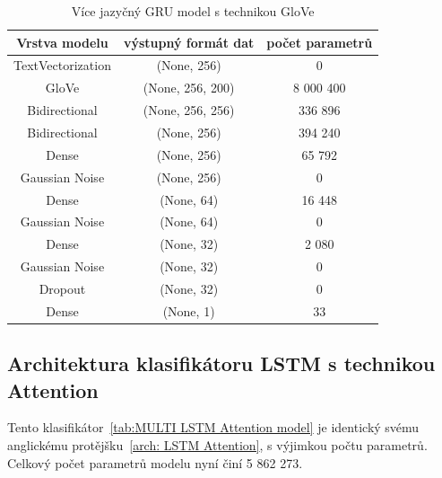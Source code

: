\begin{table}[H]
	\centering
	\caption{Více jazyčný GRU model s technikou GloVe}\label{tab:MULTI GRU GloVe model}
	\begin{tabular}{ c c c }
			\toprule
			Vrstva modelu & výstupný formát dat & počet parametrů\\
			\midrule
            TextVectorization & (None, 256) & 0\\         
            GloVe & (None, 256, 200) & 8 000 400\\   
            Bidirectional & (None, 256, 256) & 336 896\\    
            Bidirectional & (None, 256) & 394 240\\
			Dense & (None, 256) & 65 792\\ 
			Gaussian Noise & (None, 256) & 0\\
            Dense & (None, 64) & 16 448\\ 
			Gaussian Noise & (None, 64) & 0\\
			Dense & (None, 32) & 2 080\\ 
			Gaussian Noise & (None, 32) & 0\\
            Dropout & (None, 32) & 0\\   
            Dense & (None, 1) & 33\\ 
			\midrule
		\end{tabular}
\end{table}

\subsection{Architektura klasifikátoru LSTM s technikou Attention}
Tento klasifikátor~\ref{tab:MULTI LSTM Attention model} je identický svému anglickému protějšku~\ref{arch: LSTM Attention}, s výjimkou počtu parametrů.
Celkový počet parametrů modelu nyní činí 5 862 273.

